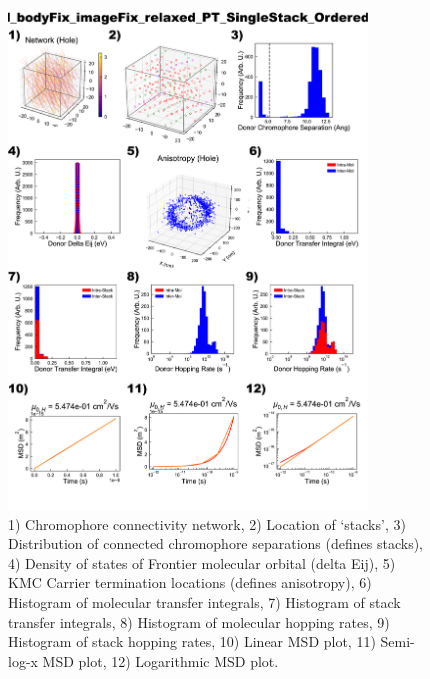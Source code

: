 \documentclass[12pt]{article}
\begin{document}
\begin{figure}[h]\centering
	\includegraphics[width=0.85\textwidth]{Figures/VRH_bodyFix_imageFix_relaxed_PT_SingleStack_Ordered_AA.png}
    \caption{   1) Chromophore connectivity network, 
                2) Location of `stacks', 
                3) Distribution of connected chromophore separations (defines stacks),
                4) Density of states of Frontier molecular orbital (delta Eij),
                5) KMC Carrier termination locations (defines anisotropy),
                6) Histogram of molecular transfer integrals,
                7) Histogram of stack transfer integrals,
                8) Histogram of molecular hopping rates,
                9) Histogram of stack hopping rates,
                10) Linear MSD plot,
                11) Semi-log-x MSD plot,
                12) Logarithmic MSD plot.}
	\label{fig:VRHPTSingOrd}
\end{figure}



\end{document}
